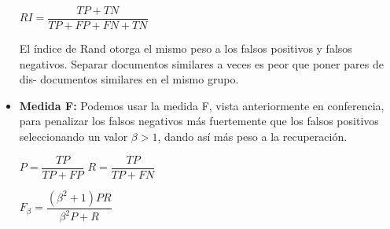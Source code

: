 \documentclass{llncs}
\begin{document}
\begin{itemize}
	\begin{center}
		$ RI = \dfrac{TP + TN}{TP + FP + FN + TN} $
	\end{center}

	El índice de Rand otorga el mismo peso a los falsos positivos y falsos negativos.
	Separar documentos similares a veces es peor que poner pares de dis-
	documentos similares en el mismo grupo.
	
	\vspace{1em}
	\item \textbf{Medida F:} Podemos usar la medida F, vista anteriormente en conferencia, para penalizar los falsos negativos más fuertemente que los falsos positivos seleccionando un valor $ \beta > 1 $, dando así más peso a la recuperación.
	\begin{center}
	$ P = \dfrac{TP}{TP + FP}  $ \hspace{2em}
	$ R = \dfrac{TP}{TP + FN} $
	
	\vspace{1em}
	$ F_{\beta} = \dfrac{(\beta^{2} + 1)PR}{\beta^{2}P + R} $
	\end{center}
\end{itemize}
\end{document}
